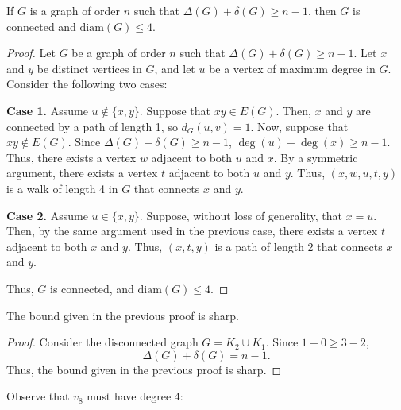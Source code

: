 \documentclass[12pt]{article}
\begin{document}
 If $G$ is a graph of order $n$ such that $\Delta(G) + \delta(G) \geq n - 1$, then $G$ is connected and $\text{diam}(G) \leq 4$.
\begin{proof}
    Let $G$ be a graph of order $n$ such that $\Delta(G) + \delta(G) \geq n - 1$.
    Let $x$ and $y$ be distinct vertices in $G$, and let $u$ be a vertex of maximum degree in $G$.
    Consider the following two cases:

    {\bf Case 1.} Assume $u \notin \{x,y\}$.
    Suppose that $xy \in E(G)$.
    Then, $x$ and $y$ are connected by a path of length 1, so $d_G(u,v) = 1$.
    Now, suppose that $xy \notin E(G)$.
    Since $\Delta(G) + \delta(G) \geq n - 1$, $\deg(u) + \deg(x) \geq n - 1$.
    Thus, there exists a vertex $w$ adjacent to both $u$ and $x$.
    By a symmetric argument, there exists a vertex $t$ adjacent to both $u$ and $y$.
    Thus, $(x, w, u, t, y)$ is a walk of length 4 in $G$ that connects $x$ and $y$.

    {\bf Case 2.} Assume $u \in \{x,y\}$.
    Suppose, without loss of generality, that $x = u$.
    Then, by the same argument used in the previous case, there exists a vertex $t$ adjacent to both $x$ and $y$.
    Thus, $(x, t, y)$ is a path of length 2 that connects $x$ and $y$.

    Thus, $G$ is connected, and $\text{diam}(G) \leq 4$.
\end{proof}


 The bound given in the previous proof is sharp.
\begin{proof}
    Consider the disconnected graph $G = K_2 \cup K_1$.
    Since $1 + 0 \geq 3 - 2$, $$\Delta(G) + \delta(G) = n - 1.$$
    Thus, the bound given in the previous proof is sharp.
\end{proof}

\bigskip
{}

Observe that $v_8$ must have degree 4:
\end{document}
